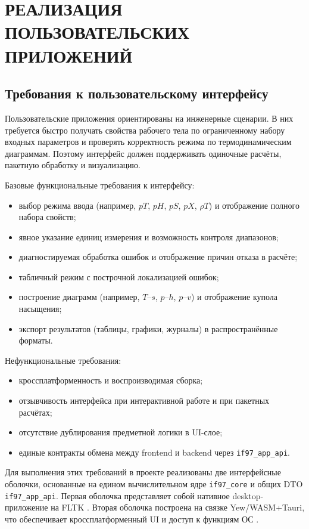 \chapter{РЕАЛИЗАЦИЯ ПОЛЬЗОВАТЕЛЬСКИХ ПРИЛОЖЕНИЙ}

\section{Требования к пользовательскому интерфейсу}

Пользовательские приложения ориентированы на инженерные сценарии.
В них требуется быстро получать свойства рабочего тела
по ограниченному набору входных параметров
и проверять корректность режима по термодинамическим диаграммам.
Поэтому интерфейс должен поддерживать
одиночные расчёты, пакетную обработку и визуализацию.

Базовые функциональные требования к интерфейсу:
\begin{itemize}
\item выбор режима ввода (например, $pT$, $pH$, $pS$, $pX$, $\rho T$) и отображение полного набора свойств;  
\item явное указание единиц измерения и возможность контроля диапазонов;  
\item диагностируемая обработка ошибок и отображение причин отказа в расчёте;  
\item табличный режим с построчной локализацией ошибок;  
\item построение диаграмм (например, $T$--$s$, $p$--$h$, $p$--$v$) и отображение купола насыщения;  
\item экспорт результатов (таблицы, графики, журналы) в распространённые форматы.  
\end{itemize}

Нефункциональные требования:
\begin{itemize}
\item кроссплатформенность и воспроизводимая сборка;  
\item отзывчивость интерфейса при интерактивной работе и при пакетных расчётах;  
\item отсутствие дублирования предметной логики в UI-слое;  
\item единые контракты обмена между frontend и backend через \texttt{if97\_app\_api}.  
\end{itemize}

Для выполнения этих требований в проекте реализованы две интерфейсные оболочки,
основанные на едином вычислительном ядре \texttt{if97\_core} и общих DTO \texttt{if97\_app\_api}.  
Первая оболочка представляет собой нативное desktop-приложение на FLTK \cite{fltk_rs_docs}.  
Вторая оболочка построена на связке Yew/WASM+Tauri,
что обеспечивает кроссплатформенный UI и доступ к функциям ОС \cite{tauri_docs}.  


